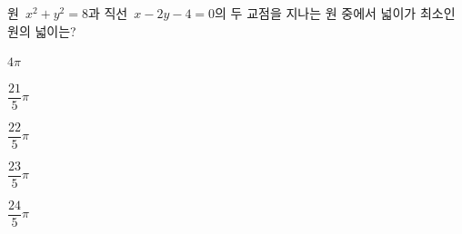 원~$x^2+y^2=8$과 직선~$x-2y-4=0$의 두 교점을 지나는 원 중에서 넓이가 최소인 원의 넓이는?
\begin{choices32}{\rule[-3ex]{0pt}{8ex}$4\pi$}{\rule[-3ex]{0pt}{8ex}$\dfrac{21}{5}\pi$}{\rule[-3ex]{0pt}{8ex}$\dfrac{22}{5}\pi$}{\rule[-3ex]{0pt}{8ex}$\dfrac{23}{5}\pi$}{\rule[-3ex]{0pt}{8ex}$\dfrac{24}{5}\pi$}\end{choices32}
